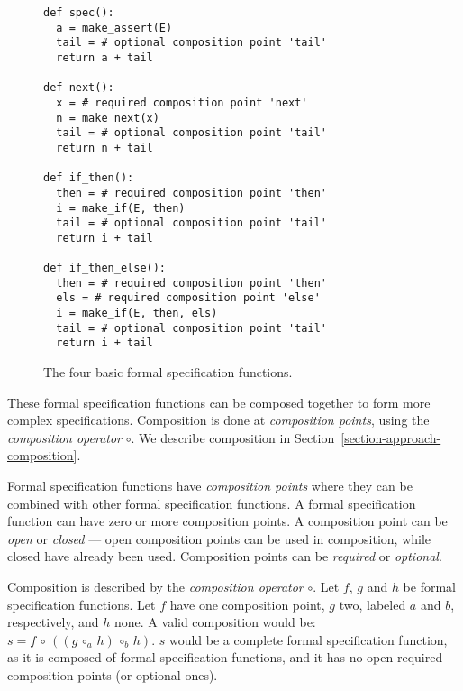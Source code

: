\begin{figure}[h!]
	\begin{center}
	\begin{minipage}{0.7\textwidth}
	\begin{lstlisting}
def spec():
  a = make_assert(E)
  tail = # optional composition point 'tail'
  return a + tail

def next():
  x = # required composition point 'next'
  n = make_next(x)
  tail = # optional composition point 'tail'
  return n + tail

def if_then():
  then = # required composition point 'then'
  i = make_if(E, then)
  tail = # optional composition point 'tail'
  return i + tail

def if_then_else():
  then = # required composition point 'then'
  els = # required composition point 'else'
  i = make_if(E, then, els)
  tail = # optional composition point 'tail'
  return i + tail
	\end{lstlisting}
	\end{minipage}
	\end{center}

	\caption{The four basic formal specification functions.}
	\label{figure-basic-formal-specification-functions}
\end{figure}

These formal specification functions can be composed together to form more
complex specifications. Composition is done at \textit{composition points},
using the \textit{composition operator} $\circ$. We describe composition in
Section~\ref{section-approach-composition}.

\begin{mydef}\label{def-composition-point}
Formal specification functions have \textit{composition points} where they can
be combined with other formal specification functions. A formal specification
function can have zero or more composition points. A composition point can be
\textit{open} or \textit{closed} --- open composition points can be used in
composition, while closed have already been used. Composition points can be
\textit{required} or \textit{optional}.
\end{mydef}

\begin{mydef}\label{def-composition-operator}
Composition is described by the \textit{composition operator} $\circ$. Let $f$,
$g$ and $h$ be formal specification functions. Let $f$ have one composition
point, $g$ two, labeled $a$ and $b$, respectively, and $h$ none. A valid
composition would be: $s = f \, \circ \, ((g \, \circ_{a} \, h) \, \circ_{b} \,
h)$.  $s$ would be a complete formal specification function, as it is composed
of formal specification functions, and it has no open required composition
points (or optional ones).
\end{mydef}

